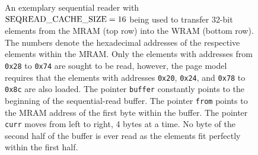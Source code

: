 \begin{figure}
	\caption{
		An exemplary sequential reader with \(\text{\lstinline|SEQREAD_CACHE_SIZE|} = 16\) being used to transfer 32-bit elements from the MRAM (top row) into the WRAM (bottom row).
		The numbers denote the hexadecimal addresses of the respective elements within the MRAM.
		Only the elements with addresses from \lstinline|0x28| to \lstinline|0x74| are sought to be read, however, the page model requires that the elements with addresses \lstinline|0x20|, \lstinline|0x24|, and \lstinline|0x78| to \lstinline|0x8c| are also loaded.
		The pointer \lstinline|buffer| constantly points to the beginning of the sequential-read buffer.
		The pointer \lstinline|from| points to the MRAM address of the first byte within the buffer.
		The pointer \lstinline|curr| moves from left to right, 4 bytes at a time.
		No byte of the second half of the buffer is ever read as the elements fit perfectly within the first half.
	}
	\label{fig:mram:reader}
\end{figure}

